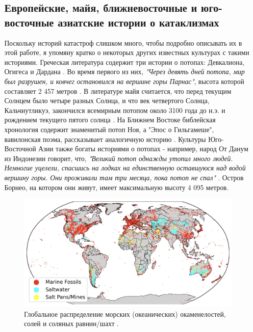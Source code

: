 \documentclass[10pt,twocolumn,letterpaper]{article}
\begin{document}
\subsection{Европейские, майя, ближневосточные и юго-восточные азиатские истории о катаклизмах}

Поскольку историй катастроф слишком много, чтобы подробно описывать их в этой работе, я упомяну кратко о некоторых других известных культурах с такими историями. Греческая литература содержит три истории о потопах: Девкалиона, Огигеса и Дардана \cite{9,10}. Во время первого из них, \textit{"Через девять дней потопа, мир был разрушен, и ковчег остановился на вершине горы Парнас"}, высота которой составляет 2 457 метров \cite{11}. В литературе майя считается, что перед текущим Солнцем было четыре разных Солнца, и что век четвертого Солнца, Кальчиутликуэ, закончился всемирным потопом около 3100 года до н.э. и рождением текущего пятого солнца \cite{12}. На Ближнем Востоке библейская хронология содержит знаменитый потоп Ноя, а "Эпос о Гильгамеше", вавилонская поэма, рассказывает аналогичную историю \cite{13}. Культуры Юго-Восточной Азии также богаты историями о потопах - например, народ От Данум из Индонезии говорит, что, \textit{"Великий потоп однажды утопил много людей. Немногие уцелели, спасшись на лодках на единственную оставшуюся над водой вершину горы. Они проживали там три месяца, пока потоп не спал"} \cite{3}. Остров Борнео, на котором они живут, имеет максимальную высоту 4 095 метров.

\begin{figure}[t]
\begin{center}
\includegraphics[width=1\textwidth]{marine.jpg}
\end{center}
   \caption{Глобальное распределение морских (океанических) окаменелостей, солей и соляных равнин/шахт \cite{15,16,86,87}.}
   \label{fig:2}
\end{figure}
\end{document}
